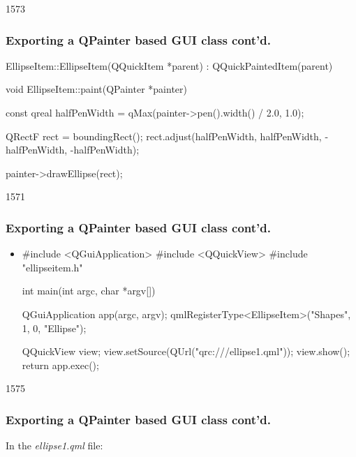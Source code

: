 \begin{slide}[fragile]{1573}\frametitle{Exporting a QPainter based GUI class cont'd.}
\begin{cpp}
EllipseItem::EllipseItem(QQuickItem *parent)
    : QQuickPaintedItem(parent)
{
}

void EllipseItem::paint(QPainter *painter)
{
    const qreal halfPenWidth =
      qMax(painter->pen().width() / 2.0, 1.0);

    QRectF rect = boundingRect();
    rect.adjust(halfPenWidth, halfPenWidth,
                -halfPenWidth, -halfPenWidth);

    painter->drawEllipse(rect);
}
\end{cpp}
\end{slide}

\begin{slide}[fragile]{1571}\frametitle{Exporting a QPainter based GUI class cont'd.}

\begin{itemize}
\item[]
\begin{cpp}
#include <QGuiApplication>
#include <QQuickView>
#include "ellipseitem.h"

int main(int argc, char *argv[])
{
    QGuiApplication app(argc, argv);
    qmlRegisterType<EllipseItem>("Shapes", 1, 0, "Ellipse");

    QQuickView view;
    view.setSource(QUrl("qrc:///ellipse1.qml"));
    view.show();
    return app.exec();
}
\end{cpp}

\end{itemize}
\end{slide}


\begin{slide}[fragile]{1575}\frametitle{Exporting a QPainter based GUI class cont'd.}

In the \textit{ellipse1.qml} file:

\vspace*{0.5em}

\end{slide}

